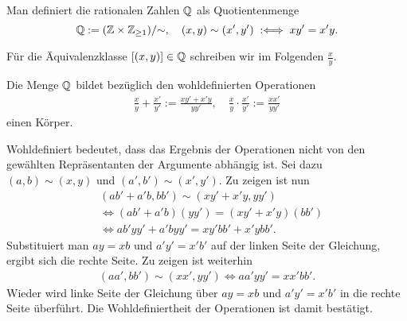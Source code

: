 \begin{Definition}\newlinefirst
Man definiert die rationalen Zahlen $\mathbb Q$ als Quotientenmenge
\[\mathbb Q := (\mathbb Z\times\mathbb Z_{\ge 1})/{\sim},\quad (x,y)\sim (x',y')\;:\Longleftrightarrow\; xy' = x'y.\]
\end{Definition}

\noindent
Für die Äquivalenzklasse $[(x,y)]\in\mathbb Q$ schreiben wir im Folgenden
$\frac{x}{y}$.

\begin{Satz}
Die Menge $\mathbb Q$ bildet bezüglich den wohldefinierten Operationen
\begin{gather*}
\frac{x}{y}+\frac{x'}{y'} := \frac{xy'+x'y}{yy'},\quad
\frac{x}{y}\cdot\frac{x'}{y'} := \frac{xx'}{yy'}
\end{gather*}
einen Körper.
\end{Satz}
\begin{Beweis}
Wohldefiniert bedeutet, dass das Ergebnis der
Operationen nicht von den gewählten Repräsentanten der Argumente
abhängig ist. Sei dazu $(a,b)\sim (x,y)$ und
$(a',b')\sim (x',y')$. Zu zeigen ist nun
\begin{align*}
&(ab'+a'b,bb')\sim (xy'+x'y,yy')\\
&\iff (ab'+a'b)(yy') = (xy'+x'y)(bb')\\
&\iff ab' yy' + a'byy' = xy'bb'+x'ybb'.
\end{align*}
Substituiert man $ay=xb$ und $a'y'=x'b'$ auf
der linken Seite der Gleichung, ergibt sich die rechte Seite.
Zu zeigen ist weiterhin
\begin{align*}
(aa',bb')\sim (xx',yy')
\iff aa'yy' = xx'bb'.
\end{align*}
Wieder wird linke Seite der Gleichung über $ay=xb$
und $a'y'=x'b'$ in die rechte Seite überführt.
Die Wohldefiniertheit der Operationen ist damit bestätigt.


\end{Beweis}
